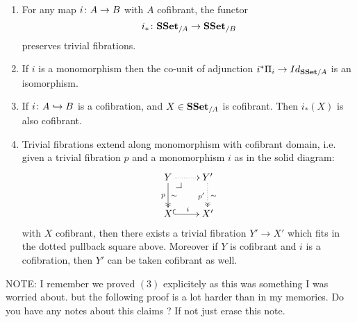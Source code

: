 \documentclass[reqno,10pt,a4paper,oneside,draft]{amsart}
\begin{document}
\begin{lemma}\label{Lemma:ForTheExtProperty} \hfill 
\begin{enumerate}[$(i)$]
\item For any map $i \colon A \rightarrow B$ with $A$ cofibrant, the functor
\[ 
 i_* \colon \mathbf{SSet}_{/A} \rightarrow \mathbf{SSet}_{/B}  
 \]
preserves trivial fibrations.
\item If $i$ is a monomorphism then the co-unit of adjunction $i^* \Pi_i \rightarrow Id_{\mathbf{SSet}/A}$ is an isomorphism.
\item If $i \colon A \hookrightarrow B$ is a cofibration, and $X \in \mathbf{SSet}_{/A}$ is cofibrant. Then $i_*(X)$ is also cofibrant.
\item Trivial fibrations extend along monomorphism with cofibrant domain, i.e. given a trivial fibration $p$ and a monomorphism $i$ as in the solid diagram:
\[
\xymatrix{
Y \ar@{.>}[r] \ar@{->>}[d]^{\sim}_{p} \drpullback  & Y' \ar@{.>>}[d]^{\sim}_{p'} \\
X \ar@{^{(}->}[r]^i &  X' }
\]
with $X$ cofibrant, then there exists a trivial fibration $Y' \rightarrow X'$ which fits in the dotted pullback square above. Moreover if $Y$ is cofibrant and $i$ is a cofibration, then $Y'$ can be taken cofibrant as well.
\end{enumerate}

\end{lemma}

 
NOTE: I remember we proved $(3)$ explicitely as this was something I was worried about. but the following proof is a lot harder than in my memories. Do you have any notes about this claims ? If not just erase this note.
\end{document}
